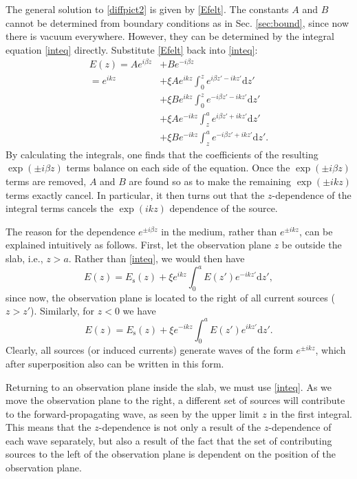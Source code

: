 \documentclass[prb,twocolumn]{revtex4-1}
\newcommand{\diff}{\text{d}}
\newcommand{\be}{\begin{equation}}
\newcommand{\ee}{\end{equation}}
\begin{document}
The general solution to \eqref{diffpict2} is given by \eqref{Efelt}. The constants $A$ and $B$ cannot be determined from boundary conditions as in Sec. \ref{sec:bound}, since now there is vacuum everywhere. However, they can be determined by the integral equation \eqref{inteq} directly. Substitute \eqref{Efelt} back into \eqref{inteq}:
\begin{align}
E(z) = Ae^{i\beta z} &+ Be^{-i\beta z} \nonumber\\
= e^{ikz} &+ \xi A e^{ikz}\int_{0}^z e^{i\beta z'-ikz'}\diff z' \nonumber\\ 
&+ \xi B e^{ikz}\int_{0}^z e^{-i\beta z'-ikz'}\diff z' \nonumber\\
&+ \xi A e^{-ikz}\int_{z}^a e^{i\beta z'+ikz'}\diff z' \nonumber\\
&+ \xi B e^{-ikz}\int_{z}^a e^{-i\beta z'+ ikz'}\diff z'.
\end{align}
By calculating the integrals, one finds that the coefficients of the resulting $\exp(\pm i\beta z)$ terms balance on each side of the equation. Once the $\exp(\pm i\beta z)$ terms are removed, $A$ and $B$ are found so as to make the remaining $\exp(\pm ikz)$ terms exactly cancel. In particular, it then turns out that the $z$-dependence of the integral terms cancels the $\exp(ikz)$ dependence of the source.

The reason for the dependence $e^{\pm i\beta z}$ in the medium, rather than $e^{\pm ikz}$, can be explained intuitively as follows. First, let the observation plane $z$ be outside the slab, i.e., $z>a$. Rather than \eqref{inteq}, we would then have
\be
E(z)= E_\text{s}(z) + \xi e^{ikz}\int_{0}^a E(z')e^{-ikz'}\diff z',
\ee
since now, the observation plane is located to the right of all current sources ($z>z'$). Similarly, for $z<0$ we have
\be
E(z)= E_\text{s}(z) + \xi e^{-ikz}\int_{0}^a E(z')e^{ikz'}\diff z'.
\ee
Clearly, all sources (or induced currents) generate waves of the form $e^{\pm ikz}$, which after superposition also can be written in this form. 

Returning to an observation plane inside the slab, we must use \eqref{inteq}. As we move the observation plane to the right, a different set of sources will contribute to the forward-propagating wave, as seen by the upper limit $z$ in the first integral. This means that the $z$-dependence is not only a result of the $z$-dependence of each wave separately, but also a result of the fact that the set of contributing sources to the left of the observation plane is dependent on the position of the observation plane.
\end{document}
